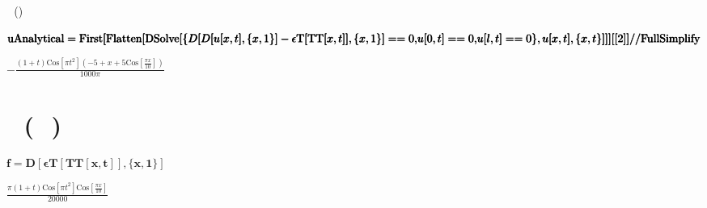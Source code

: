 \documentclass{article}
\newcommand{\unicode}[1]{{}}
\begin{document}
$\unicode{0410}\unicode{043d}\unicode{0430}\unicode{043b}\unicode{0438}\unicode{0442}\unicode{0438}\unicode{0447}\unicode{0435}\unicode{0441}\unicode{043a}\unicode{043e}\unicode{0435}$
$\unicode{0440}\unicode{0435}\unicode{0448}\unicode{0435}\unicode{043d}\unicode{0438}\unicode{0435}$ ($\unicode{043f}\unicode{0435}\unicode{0440}\unicode{0435}\unicode{043c}\unicode{0435}\unicode{0449}\unicode{0435}\unicode{043d}\unicode{0438}\unicode{044f}$)

\begin{doublespace}
\noindent\(\pmb{\text{uAnalytical} = }\\
\pmb{\text{First}[\text{Flatten}[}\\
\pmb{\text{DSolve}[\{}\\
\pmb{D[D[u[x,t], \{x, 1\}]-\text{$\epsilon $T}[\text{TT}[x, t]], \{x, 1\}]== 0,}\\
\pmb{u[0, t] == 0, }\\
\pmb{u[l, t] == 0}\\
\pmb{\},u[x,t],\{x, t\}]]}\\
\pmb{][[2]] \text{//} \text{FullSimplify}}\)
\end{doublespace}

\begin{doublespace}
\noindent\(-\frac{(1+t) \text{Cos}\left[\pi  t^2\right] \left(-5+x+5 \text{Cos}\left[\frac{\pi  x}{10}\right]\right)}{1000 \pi }\)
\end{doublespace}

\section*{$\unicode{0427}\unicode{0438}\unicode{0441}\unicode{043b}\unicode{0435}\unicode{043d}\unicode{043d}\unicode{043e}\unicode{0435}$ $\unicode{0440}\unicode{0435}\unicode{0448}\unicode{0435}\unicode{043d}\unicode{0438}\unicode{0435}$
($\unicode{043c}\unicode{0435}\unicode{0442}\unicode{043e}\unicode{0434}$ $\unicode{043a}\unicode{043e}\unicode{043d}\unicode{0435}\unicode{0447}\unicode{043d}\unicode{044b}\unicode{0445}$
$\unicode{0440}\unicode{0430}\unicode{0437}\unicode{043d}\unicode{043e}\unicode{0441}\unicode{0442}\unicode{0435}\unicode{0439}$)}

\begin{doublespace}
\noindent\(\pmb{f= D[\text{$\epsilon $T}[\text{TT}[x, t]], \{x, 1\}]}\)
\end{doublespace}

\begin{doublespace}
\noindent\(\frac{\pi  (1+t) \text{Cos}\left[\pi  t^2\right] \text{Cos}\left[\frac{\pi  x}{10}\right]}{20000}\)
\end{doublespace}
\end{document}
